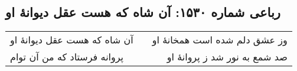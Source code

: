 \begin{center}
\section*{رباعی شماره ۱۵۳۰: آن شاه که هست عقل دیوانهٔ او}
\label{sec:1530}
\begin{longtable}{l p{0.5cm} r}
آن شاه که هست عقل دیوانهٔ او
&&
وز عشق دلم شده است همخانهٔ او
\\
پروانه فرستاد که من آن توام
&&
صد شمع به نور شد ز پروانهٔ او
\\
\end{longtable}
\end{center}
